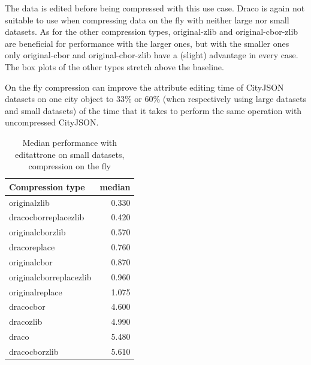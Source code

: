 The data is edited before being compressed with this use case.
Draco is again not suitable to use when compressing data on the fly with neither large nor small datasets.
As for the other compression types, original-zlib and original-cbor-zlib are beneficial for performance with the larger ones, but with the smaller ones only original-cbor and original-cbor-zlib have a (slight) advantage in every case.
The box plots of the other types stretch above the baseline.

On the fly compression can improve the attribute editing time of CityJSON datasets on one city object to 33\% or 60\% (when respectively using large datasets and small datasets) of the time that it takes to perform the same operation with uncompressed CityJSON.



\begin{table}[!h]
    \begin{minipage}{.5\linewidth}
      \caption{
Median performance with editattrone on large datasets, compression on the fly}
\centering

\begin{tabular}{|l|r|}
\hline
Compression type & median\\
\hline
originalzlib & 0.330\\
\hline
dracocborreplacezlib & 0.420\\
\hline
originalcborzlib & 0.570\\
\hline
dracoreplace & 0.760\\
\hline
originalcbor & 0.870\\
\hline
originalcborreplacezlib & 0.960\\
\hline
originalreplace & 1.075\\
\hline
dracocbor & 4.600\\
\hline
dracozlib & 4.990\\
\hline
draco & 5.480\\
\hline
dracocborzlib & 5.610\\
\hline
\end{tabular}
\end{minipage}%
    \begin{minipage}{.5\linewidth}
      \centering
        \caption{
Median performance with editattrone on small datasets, compression on the fly}


\end{minipage}
\end{table}
